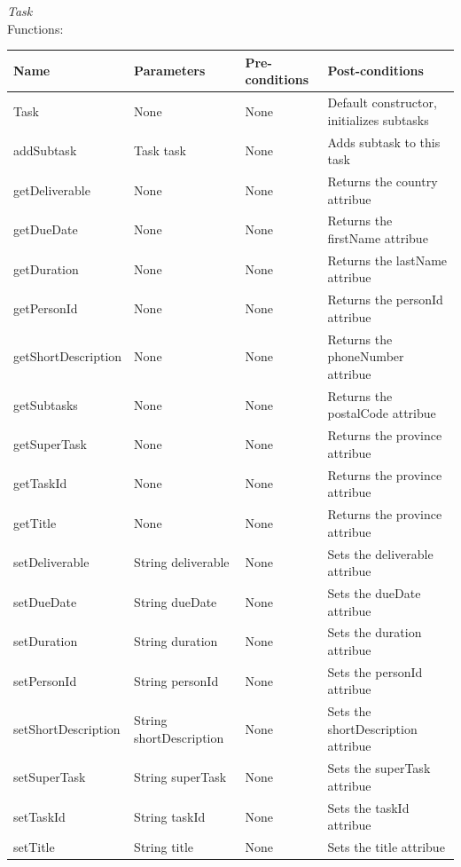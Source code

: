 \emph{Task}\\
Functions:\\
\begin{tabular}{| l | l | l | l |}
\hline
Name & Parameters & Pre-conditions & Post-conditions\\
\hline
		Task		& None       			& None			& Default constructor, initializes subtasks \\
		addSubtask		& Task task			& None       	 	& Adds subtask to this task \\
		getDeliverable		& None				& None       	 	& Returns the country attribue \\
		getDueDate		& None				& None       	 	& Returns the firstName attribue \\
		getDuration		& None				& None       	 	& Returns the lastName attribue \\
		getPersonId		& None				& None       	 	& Returns the personId attribue \\
		getShortDescription	& None				& None       	 	& Returns the phoneNumber attribue \\
		getSubtasks		& None				& None       	 	& Returns the postalCode attribue \\
		getSuperTask		& None				& None       	 	& Returns the province attribue \\
		getTaskId		& None		  		& None			& Returns the province attribue \\
		getTitle		& None				& None       	 	& Returns the province attribue \\
		setDeliverable		& String deliverable		& None       	 	& Sets the deliverable attribue \\
		setDueDate		& String dueDate		& None       	 	& Sets the dueDate attribue \\
		setDuration		& String duration		& None       	 	& Sets the duration attribue \\
		setPersonId		& String personId		& None       	 	& Sets the personId attribue \\
		setShortDescription	& String shortDescription	& None       	 	& Sets the shortDescription attribue \\
		setSuperTask		& String superTask		& None       	 	& Sets the superTask attribue \\
		setTaskId		& String taskId	  		& None			& Sets the taskId attribue \\
		setTitle			& String title			& None       	 	& Sets the title attribue
\\
\hline
\end{tabular}
\\

